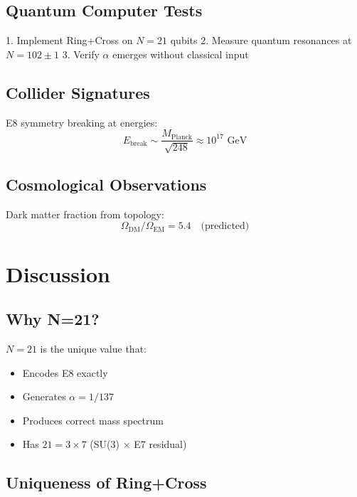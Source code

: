 \documentclass[12pt,a4paper]{article}
\begin{document}
\subsection{Quantum Computer Tests}

1. Implement Ring+Cross on $N=21$ qubits
2. Measure quantum resonances at $N=102 \pm 1$
3. Verify $\alpha$ emerges without classical input

\subsection{Collider Signatures}

E8 symmetry breaking at energies:
\begin{equation}
E_{\text{break}} \sim \frac{M_{\text{Planck}}}{\sqrt{248}} \approx 10^{17} \text{ GeV}
\end{equation}

\subsection{Cosmological Observations}

Dark matter fraction from topology:
\begin{equation}
\Omega_{\text{DM}}/\Omega_{\text{EM}} = 5.4 \quad \text{(predicted)}
\end{equation}

\section{Discussion}

\subsection{Why N=21?}

$N=21$ is the unique value that:
\begin{itemize}
\item Encodes E8 exactly
\item Generates $\alpha = 1/137$
\item Produces correct mass spectrum
\item Has $21 = 3 \times 7$ (SU(3) $\times$ E7 residual)
\end{itemize}

\subsection{Uniqueness of Ring+Cross}
\end{document}

